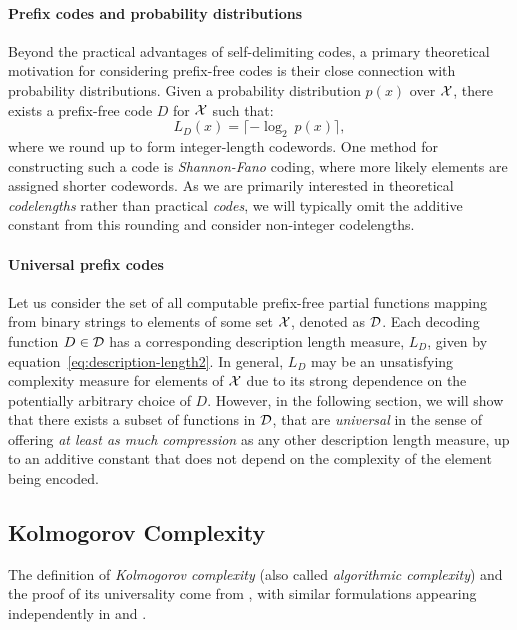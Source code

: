 \paragraph{Prefix codes and probability distributions} Beyond the practical advantages of self-delimiting codes, a primary theoretical motivation for considering prefix-free codes is their close connection with probability distributions. Given a probability distribution $p(x)$ over ${\mathcal{X}}$, there exists a prefix-free code $D$ for ${\mathcal{X}}$ such that:
\begin{equation}
L_D(x) = \lceil-\log_2~p(x)\rceil,
\end{equation}
where we round up to form integer-length codewords. One method for constructing such a code is \emph{Shannon-Fano} coding, where more likely elements are assigned shorter codewords. 
As we are primarily interested in theoretical \emph{codelengths} rather than practical \emph{codes}, we will typically omit the additive constant from this rounding and consider non-integer codelengths.

\paragraph{Universal prefix codes} Let us consider the set of all computable prefix-free partial functions mapping from binary strings to elements of some set ${\mathcal{X}}$, denoted as ${\mathcal{D}}$. Each decoding function $D \in {\mathcal{D}}$ has a corresponding description length measure, $L_D$, given by equation~\ref{eq:description-length2}.
In general, $L_D$ may be an unsatisfying complexity measure for elements of ${\mathcal{X}}$ due to its strong dependence on the potentially arbitrary choice of $D$. However, in the following section, we will show that there exists a subset of functions in ${\mathcal{D}}$, that are \emph{universal} in the sense of offering \emph{at least as much compression} as any other description length measure, up to an additive constant that does not depend on the complexity of the element being encoded.


\subsection{Kolmogorov Complexity}
\label{sec:background-kolmogorov-complexity}

The definition of \emph{Kolmogorov complexity} (also called \emph{algorithmic complexity}) and the proof of its universality come from \citet{kolmogorov1965three}, with similar formulations appearing independently in \citet{solomonoff1964formal} and \citet{chaitin1969length}.

